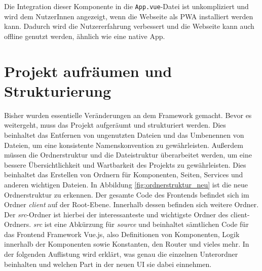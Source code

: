 Die Integration dieser Komponente in die \texttt{App.vue}-Datei ist unkompliziert und wird dem NutzerInnen angezeigt, wenn die Webseite als \acs{PWA} installiert werden kann. Dadurch wird die Nutzererfahrung verbessert und die Webseite kann auch offline genutzt werden, ähnlich wie eine native App. \cite{vite-plugin-pwa}

\section{Projekt aufräumen und Strukturierung}

Bisher wurden essentielle Veränderungen an dem Framework gemacht.
Bevor es weitergeht, muss das Projekt aufgeräumt und strukturiert werden.
Dies beinhaltet das Entfernen von ungenutzten Dateien und das Umbenennen von Dateien, um eine konsistente Namenskonvention zu gewährleisten.
Außerdem müssen die Ordnerstruktur und die Dateistruktur überarbeitet werden, um eine bessere Übersichtlichkeit und Wartbarkeit des Projekts zu gewährleisten.
Dies beinhaltet das Erstellen von Ordnern für Komponenten, Seiten, Services und anderen wichtigen Dateien.
In Abbildung \ref{fig:ordnerstruktur_neu} ist die neue Ordnerstruktur zu erkennen.
Der gesamte Code des Frontends befindet sich im Ordner \textit{client} auf der Root-Ebene.
Innerhalb dessen befinden sich weitere Ordner.
Der \textit{src}-Ordner ist hierbei der interessanteste und wichtigste Ordner des client-Ordners.
\textit{src} ist eine Abkürzung für \textit{source} und beinhaltet sämtlichen Code für das Frontend Framework Vue.js, also Definitionen von Komponenten, Logik innerhalb der Komponenten sowie Konstanten, den Router und vieles mehr.
In der folgenden Auflistung wird erklärt, was genau die einzelnen Unterordner beinhalten und welchen Part in der neuen UI sie dabei einnehmen.
